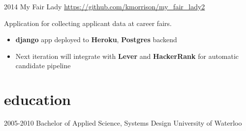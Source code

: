 \documentclass[]{friggeri-cv} %
\begin{document}
\begin{entrylist}
\entry
{2014}
{My Fair Lady}
{\href{https://github.com/kmorrison/my\_fair\_lady2}{https://github.com/kmorrison/my\_fair\_lady2}}
{
Application for collecting applicant data at career fairs.
\begin{itemize}
\item \textbf{django} app deployed to \textbf{Heroku}, \textbf{Postgres} backend
\item Next iteration will integrate with \textbf{Lever} and \textbf{HackerRank} for automatic candidate pipeline
\end{itemize}}

\end{entrylist}

\section{education}

\begin{entrylist}


\entry
{2005-2010}
{Bachelor {\normalfont of Applied Science}, Systems Design}
{University of Waterloo}


\end{entrylist}


\end{document}
